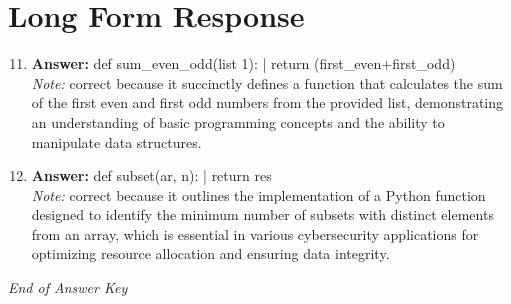 \documentclass[12pt]{article}
\begin{document}
\section*{Long Form Response}
\begin{enumerate}[label=\arabic*.]
\setcounter{enumi}{10}
\item \textbf{Answer:} def sum\_even\_odd(list 1): | return (first\_even+first\_odd)
\\ \textit{Note:} correct because it succinctly defines a function that calculates the sum of the first even and first odd numbers from the provided list, demonstrating an understanding of basic programming concepts and the ability to manipulate data structures.
\item \textbf{Answer:} def subset(ar, n): | return res
\\ \textit{Note:} correct because it outlines the implementation of a Python function designed to identify the minimum number of subsets with distinct elements from an array, which is essential in various cybersecurity applications for optimizing resource allocation and ensuring data integrity.
\end{enumerate}

\vfill
\noindent\textit{End of Answer Key}
\end{document}
